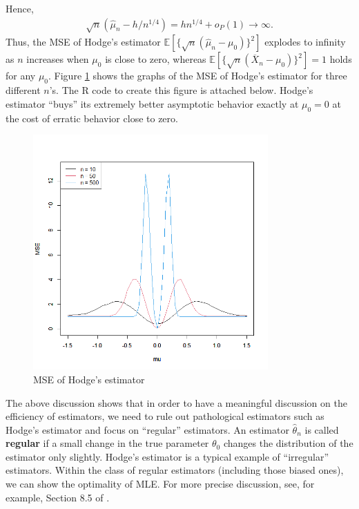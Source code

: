\documentclass[10.5pt, A4paper, openany, uplatex]{book}
\newcommand{\E}{\mathbb{E}}
\renewcommand{\hat}{\widehat}
\renewcommand{\bar}{\overline}
\numberwithin{equation}{section}
\begin{document}
Hence,
\begin{align*}
	\sqrt{n}(\hat \mu_n - h/n^{1/4}) = hn^{1/4} + o_P(1) \to \infty.
\end{align*}
Thus, the MSE of Hodge's estimator $\E [\{\sqrt{n}(\hat \mu_n - \mu_0)\}^2]$ explodes to infinity as $n$ increases when $\mu_0$ is close to zero, whereas $\E[\{\sqrt{n}(\bar X_n - \mu_0)\}^2] = 1$ holds for any $\mu_0$.
Figure \ref{fig:hodge} shows the graphs of the MSE of Hodge's estimator for three different $n$'s.
The R code to create this figure is attached below.
Hodge's estimator ``buys'' its extremely better asymptotic behavior exactly at $\mu_0 = 0$ at the cost of erratic behavior close to zero.

\begin{figure}[h!]
	\begin{center}
		\includegraphics[width = 9cm]{hodge.png}
		\caption{MSE of Hodge's estimator}
		\label{fig:hodge}
	\end{center}
\end{figure}

The above discussion shows that in order to have a meaningful discussion on the efficiency of estimators, we need to rule out pathological estimators such as Hodge's estimator and focus on ``regular'' estimators.
An estimator $\hat \theta_n$ is called \textbf{regular} if a small change in the true parameter $\theta_0$ changes the distribution of the estimator only slightly.
Hodge's estimator is a typical example of ``irregular'' estimators.
Within the class of regular estimators (including those biased ones), we can show the optimality of MLE.
For more precise discussion, see, for example, Section 8.5 of \cite{van2000asymptotic}.
\end{document}
